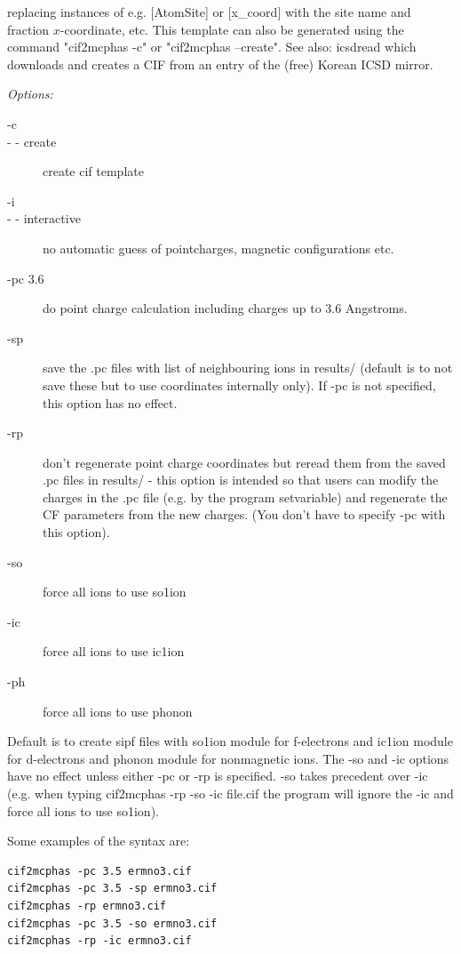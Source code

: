 \begin{description}
replacing instances of e.g. [AtomSite] or [x\_coord] with the site name and fraction $x$-coordinate, etc.
This template can also be generated using the command "{\prg cif2mcphas -c}" or "{\prg cif2mcphas --create}".
See also: {\prg icsdread} which downloads and creates a CIF from an entry of the (free) Korean ICSD mirror.

{\em Options:}
\begin{description}
\item[-c]
\item[- - create]  create cif template
\item[-i]
\item[- - interactive] no automatic guess of pointcharges, magnetic configurations etc. 
\item[-pc 3.6] do point charge calculation including charges up to 3.6 Angstroms.

\item[-sp       ] save the .pc files with list of neighbouring ions in results/ (default is to not save these but to use coordinates internally only). If -pc is not specified, this option has no effect.

\item[-rp        ] don't regenerate point charge coordinates but reread them from 
the saved .pc files in results/ - this option is intended so that users can 
modify the charges in the .pc file (e.g. by the program {\prg setvariable})
 and regenerate the CF parameters 
from the new charges. (You don't have to specify -pc with this option).

\item[-so       ]  force all ions to use so1ion
\item[-ic        ] force all ions to use ic1ion
\item[-ph        ] force all ions to use phonon
\end{description}

Default is to create sipf files with so1ion module for f-electrons and ic1ion module for d-electrons
and phonon module for nonmagnetic ions.
 The {\prg -so} and {\prg -ic} options have no effect unless either {\prg -pc}
 or {\prg -rp} is specified.
{\prg -so} takes precedent over {\prg -ic} (e.g. 
when typing {\prg cif2mcphas -rp -so -ic file.cif} the program will ignore the
{\prg -ic} and force all ions to use so1ion).

Some examples of the syntax are:
\begin{verbatim}
cif2mcphas -pc 3.5 ermno3.cif
cif2mcphas -pc 3.5 -sp ermno3.cif
cif2mcphas -rp ermno3.cif
cif2mcphas -pc 3.5 -so ermno3.cif
cif2mcphas -rp -ic ermno3.cif
\end{verbatim}


\end{description}
